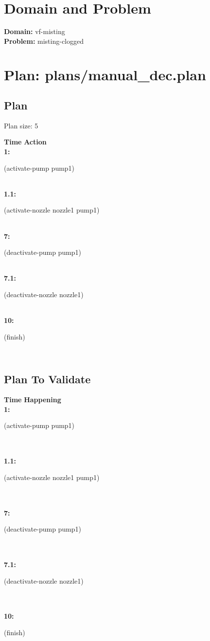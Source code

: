 \documentclass[a4paper,12pt]{article}
\author{\mbox{\sc {\sc Val}}}
\newcommand{\headingtimeaction}{{\bf Time} \qquad \= {\bf Action}\\[0.8ex]}
\newcommand{\headingtimehappening}{{\bf Time} \qquad \= {\bf Happening}\\[0.8ex]}
\newcommand{\atime}[1]{{\bf #1:}}
\newcommand{\action}[1]{{\sf #1}}
\newcommand{\listrow}[1]{\begin{minipage}[t]{11.5cm} #1 \end{minipage}}
\begin{document}
 \maketitle 
\section{Domain and Problem}
{\bf Domain:} vf-misting\\
{\bf Problem:} misting-clogged
\section{\sloppy Plan: plans/\-manual\_dec.plan}
\subsection{Plan}
Plan size: 5
\begin{tabbing}
\headingtimeaction 
\atime{1} \> \listrow{\action{(activate-pump pump1)}}\\
\atime{1.1} \> \listrow{\action{(activate-nozzle nozzle1 pump1)}}\\
\atime{7} \> \listrow{\action{(deactivate-pump pump1)}}\\
\atime{7.1} \> \listrow{\action{(deactivate-nozzle nozzle1)}}\\
\atime{10} \> \listrow{\action{(finish)}}\\
\end{tabbing}
\subsection{Plan To Validate}
\begin{tabbing}
\headingtimehappening 
\atime{1}  \> \listrow{\action{(activate-pump pump1)}}\\
\\\atime{1.1}  \> \listrow{\action{(activate-nozzle nozzle1 pump1)}}\\
\\\atime{7}  \> \listrow{\action{(deactivate-pump pump1)}}\\
\\\atime{7.1}  \> \listrow{\action{(deactivate-nozzle nozzle1)}}\\
\\\atime{10}  \> \listrow{\action{(finish)}}\\
\end{tabbing}
\end{document}

